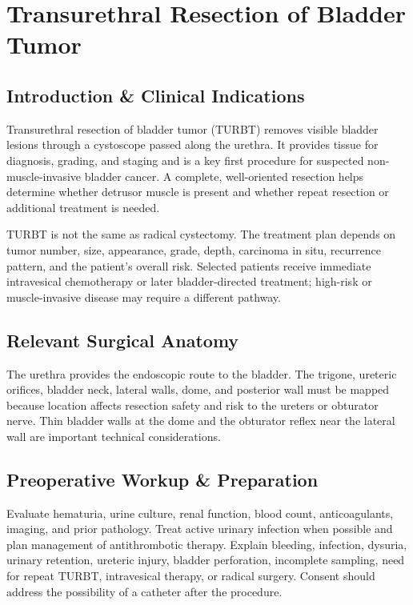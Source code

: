 \chapter{Transurethral Resection of Bladder Tumor}

\section*{Introduction \& Clinical Indications}
Transurethral resection of bladder tumor (TURBT) removes visible bladder lesions through a cystoscope passed along the urethra. It provides tissue for diagnosis, grading, and staging and is a key first procedure for suspected non-muscle-invasive bladder cancer. A complete, well-oriented resection helps determine whether detrusor muscle is present and whether repeat resection or additional treatment is needed.

TURBT is not the same as radical cystectomy. The treatment plan depends on tumor number, size, appearance, grade, depth, carcinoma in situ, recurrence pattern, and the patient’s overall risk. Selected patients receive immediate intravesical chemotherapy or later bladder-directed treatment; high-risk or muscle-invasive disease may require a different pathway.

\section*{Relevant Surgical Anatomy}
The urethra provides the endoscopic route to the bladder. The trigone, ureteric orifices, bladder neck, lateral walls, dome, and posterior wall must be mapped because location affects resection safety and risk to the ureters or obturator nerve. Thin bladder walls at the dome and the obturator reflex near the lateral wall are important technical considerations.

\section*{Preoperative Workup \& Preparation}
Evaluate hematuria, urine culture, renal function, blood count, anticoagulants, imaging, and prior pathology. Treat active urinary infection when possible and plan management of antithrombotic therapy. Explain bleeding, infection, dysuria, urinary retention, ureteric injury, bladder perforation, incomplete sampling, need for repeat TURBT, intravesical therapy, or radical surgery. Consent should address the possibility of a catheter after the procedure.

